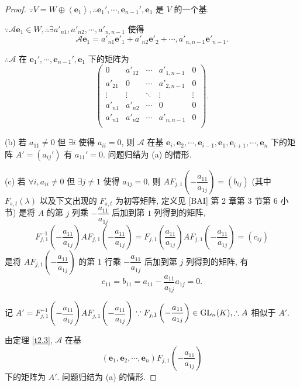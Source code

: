 \documentclass[color=black,device=normal,lang=cn,mode=geye]{elegantnote}
\begin{document}
\begin{proof}
    $\because V=W\oplus\left<\boldsymbol{e}_1\right>,\therefore\boldsymbol{e}_1',\cdots,\boldsymbol{e}_{n-1}',\boldsymbol{e}_1$ 是 $V$ 的一个基.
    
    $\because\mathcal{A}\boldsymbol{e}_1\in W,\therefore\exists a'_{n1},a'_{n2},\cdots,a'_{n,n-1}$ 使得
    \[\mathcal{A}\boldsymbol{e}_1=a'_{n1}\boldsymbol{e}'_1+a'_{n2}\boldsymbol{e}'_2+\cdots,a'_{n,n-1}\boldsymbol{e}'_{n-1}.\]

    $\therefore\mathcal{A}$ 在 $\boldsymbol{e}_1',\cdots,\boldsymbol{e}_{n-1}',\boldsymbol{e}_1$ 下的矩阵为
    \[\begin{pmatrix}
        0 & a'_{12} & \cdots & a'_{1,n-1} & 0 \\
        a'_{21} & 0 & \cdots & a'_{2,n-1} & 0 \\
        \vdots & \vdots & \ddots & \vdots & \vdots \\
        a'_{n1} & a'_{n2} & \cdots & 0 & 0 \\
        a'_{n1} & a'_{n2} & \cdots & a'_{n,n-1} & 0 \\
    \end{pmatrix}.\]

    (b) 若 $a_{11}\neq0$ 但 $\exists i$ 使得 $a_{ii}=0$, 则 $\mathcal{A}$ 在基 $\boldsymbol{e}_i,\boldsymbol{e}_2,\cdots,\boldsymbol{e}_{i-1},\boldsymbol{e}_1,\boldsymbol{e}_{i+1},\cdots,\boldsymbol{e}_n$ 下的矩阵 $A'=(a_{ij}')$ 有 $a_{11}'=0$. 问题归结为 (a) 的情形.

    (c) 若 $\forall i,a_{ii}\neq0$ 但 $\exists j\neq 1$ 使得 $a_{1j}=0$, 则 $AF_{j,1}\left(-\dfrac{a_{11}}{a_{1j}}\right)=(b_{ij})$ (其中 $F_{s,t}(\lambda)$ 以及下文出现的 $F_{s,t}$ 为初等矩阵, 定义见 [BAI] 第 2 章第 3 节第 6 小节) 是将 $A$ 的第 $j$ 列乘 $-\dfrac{a_{11}}{a_{1j}}$ 后加到第 $1$ 列得到的矩阵,
    \[F^{-1}_{j,1}\left(-\dfrac{a_{11}}{a_{1j}}\right)AF_{j,1}\left(-\dfrac{a_{11}}{a_{1j}}\right)=F_{j,1}\left(\dfrac{a_{11}}{a_{1j}}\right)AF_{j,1}\left(-\dfrac{a_{11}}{a_{1j}}\right)=(c_{ij})\]
    是将 $AF_{j,1}\left(-\dfrac{a_{11}}{a_{1j}}\right)$ 的第 $1$ 行乘 $-\dfrac{a_{11}}{a_{1j}}$ 后加到第 $j$ 列得到的矩阵, 有
    \[c_{11}=b_{11}=a_{11}-\dfrac{a_{11}}{a_{1j}}a_{1j}=0.\]

    记 $A'=F^{-1}_{j,1}\left(-\dfrac{a_{11}}{a_{1j}}\right)AF_{j,1}\left(-\dfrac{a_{11}}{a_{1j}}\right)$ $\because F_{j,1}\left(-\dfrac{a_{11}}{a_{1j}}\right)\in\operatorname{GL} _n(K),\therefore A$ 相似于 $A'$.

    由定理 \ref{t2.3}, $\mathcal{A}$ 在基
    \[(\boldsymbol{e}_1,\boldsymbol{e}_2,\cdots,\boldsymbol{e}_n)F_{j,1}\left(-\dfrac{a_{11}}{a_{1j}}\right)\]
    下的矩阵为 $A'$. 问题归结为 (a) 的情形.


\end{proof}
\end{document}
